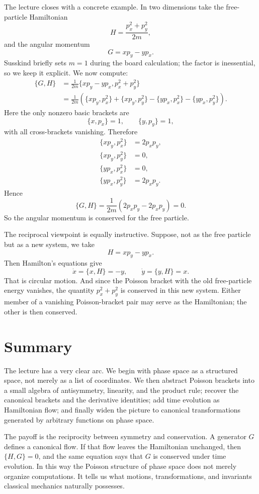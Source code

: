 The lecture closes with a concrete example. In two dimensions take the free-particle Hamiltonian
\begin{equation}
H=\frac{p_x^2+p_y^2}{2m},
\end{equation}
and the angular momentum
\begin{equation}
G=xp_y-yp_x.
\end{equation}
Susskind briefly sets \(m=1\) during the board calculation; the factor is inessential, so we keep it explicit. We now compute:
\begin{align}
\{G,H\}
&=\frac{1}{2m}\{xp_y-yp_x,p_x^2+p_y^2\} \\
&=\frac{1}{2m}\left(
\{xp_y,p_x^2\}
+\{xp_y,p_y^2\}
-\{yp_x,p_x^2\}
-\{yp_x,p_y^2\}
\right).
\end{align}
Here the only nonzero basic brackets are
\[
\{x,p_x\}=1,\qquad \{y,p_y\}=1,
\]
with all cross-brackets vanishing. Therefore
\begin{align}
\{xp_y,p_x^2\} &= 2p_xp_y, \\
\{xp_y,p_y^2\} &= 0, \\
\{yp_x,p_x^2\} &= 0, \\
\{yp_x,p_y^2\} &= 2p_xp_y.
\end{align}
Hence
\begin{equation}
\{G,H\}=\frac{1}{2m}\left(2p_xp_y-2p_xp_y\right)=0.
\end{equation}
So the angular momentum is conserved for the free particle.

The reciprocal viewpoint is equally instructive. Suppose, not as the free particle but as a new system, we take
\begin{equation}
H=xp_y-yp_x.
\end{equation}
Then Hamilton's equations give
\begin{equation}
\dot x=\{x,H\}=-y,\qquad \dot y=\{y,H\}=x.
\end{equation}
That is circular motion. And since the Poisson bracket with the old free-particle energy vanishes, the quantity \(p_x^2+p_y^2\) is conserved in this new system. Either member of a vanishing Poisson-bracket pair may serve as the Hamiltonian; the other is then conserved.

\section{Summary}

The lecture has a very clear arc. We begin with phase space as a structured space, not merely as a list of coordinates. We then abstract Poisson brackets into a small algebra of antisymmetry, linearity, and the product rule; recover the canonical brackets and the derivative identities; add time evolution as Hamiltonian flow; and finally widen the picture to canonical transformations generated by arbitrary functions on phase space.

The payoff is the reciprocity between symmetry and conservation. A generator \(G\) defines a canonical flow. If that flow leaves the Hamiltonian unchanged, then \(\{H,G\}=0\), and the same equation says that \(G\) is conserved under time evolution. In this way the Poisson structure of phase space does not merely organize computations. It tells us what motions, transformations, and invariants classical mechanics naturally possesses.